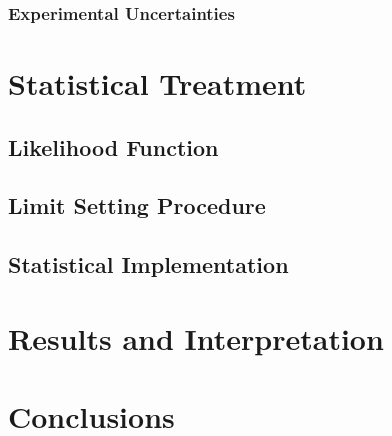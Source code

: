 \documentclass{outhesis}
\begin{document}
\subsection{Experimental Uncertainties}\label{sec:syst.exp}


\chapter{Statistical Treatment}\label{chap:stat}
\graphicspath{{figures/stat/}}

\section{Likelihood Function}

\section{Limit Setting Procedure}

\section{Statistical Implementation}


\chapter{Results and Interpretation}\label{chap:res}
\graphicspath{{figures/res/}}


\chapter{Conclusions}\label{chap:concl}
\graphicspath{{figures/concl/}}

\end{document}
